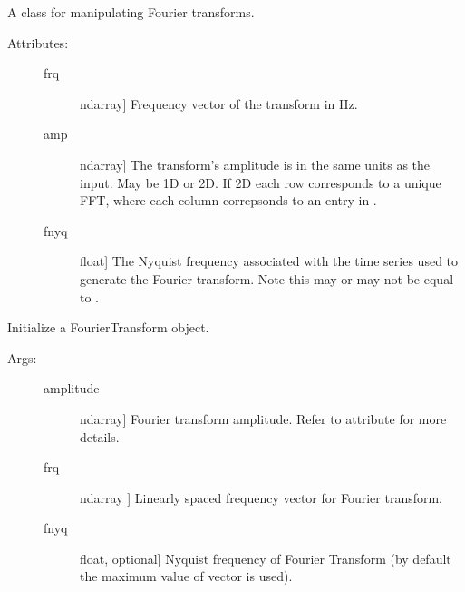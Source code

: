 \documentclass[letterpaper,10pt,english]{sphinxmanual}
\begin{document}
\begin{fulllineitems}
\label{\detokenize{index:sigpropy.FourierTransform}}
A class for manipulating Fourier transforms.
\begin{description}
\item[{Attributes:}] \leavevmode\begin{description}
\item[{frq}] \leavevmode{[}ndarray{]}
Frequency vector of the transform in Hz.

\item[{amp}] \leavevmode{[}ndarray{]}
The transform’s amplitude is in the same units as the input.
May be 1D or 2D. If 2D each row corresponds to a unique FFT,
where each column correpsonds to an entry in .

\item[{fnyq}] \leavevmode{[}float{]}
The Nyquist frequency associated with the time series used
to generate the Fourier transform. Note this may or may not
be equal to .

\end{description}

\end{description}

\begin{fulllineitems}
\label{\detokenize{index:sigpropy.FourierTransform.__init__}}
Initialize a FourierTransform object.
\begin{description}
\item[{Args:}] \leavevmode\begin{description}
\item[{amplitude}] \leavevmode{[}ndarray{]}
Fourier transform amplitude. Refer to attribute 
for more details.

\item[{frq}] \leavevmode{[}ndarray {]}
Linearly spaced frequency vector for Fourier transform.

\item[{fnyq}] \leavevmode{[}float, optional{]}
Nyquist frequency of Fourier Transform (by default the
maximum value of  vector is used).


\end{description}
\end{description}
\end{fulllineitems}
\end{fulllineitems}
\end{document}
